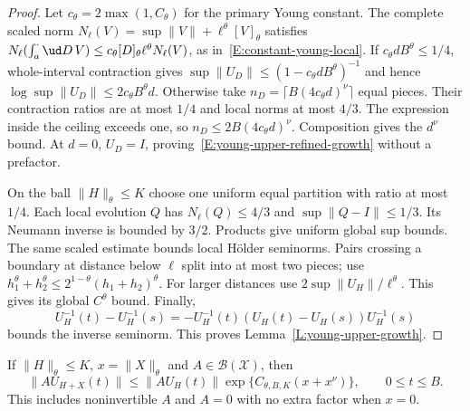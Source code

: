 \begin{proof}
  Let $c_\theta=2\max(1,C_\theta)$ for the primary Young constant.
  The complete scaled norm
  $N_\ell(V)=\sup\|V\|+\ell^\theta[V]_\theta$ satisfies
  $N_\ell(\int_a^\cdot\ud D\,V)
  \le c_\theta[D]_\theta\ell^\theta N_\ell(V)$,
  as in~\eqref{E:constant-young-local}.
  If $c_\theta dB^\theta\le1/4$, whole-interval contraction gives
  $\sup\|U_D\|\le(1-c_\theta dB^\theta)^{-1}$ and hence
  $\log\sup\|U_D\|\le2c_\theta B^\theta d$.
  Otherwise take $n_D=\lceil B(4c_\theta d)^\nu\rceil$ equal
  pieces. Their contraction ratios are at most $1/4$ and local
  norms at most $4/3$. The expression inside the ceiling exceeds
  one, so $n_D\le2B(4c_\theta d)^\nu$.
  Composition gives the $d^\nu$ bound. At $d=0$, $U_D=I$,
  proving~\eqref{E:young-upper-refined-growth} without a prefactor.

  On the ball $\|H\|_\theta\le K$ choose one uniform equal
  partition with ratio at most $1/4$.
  Each local evolution $Q$ has $N_\ell(Q)\le4/3$ and
  $\sup\|Q-I\|\le1/3$. Its Neumann inverse is bounded by $3/2$.
  Products give uniform global sup bounds.
  The same scaled estimate bounds local H\"older seminorms.
  Pairs crossing a boundary at distance below $\ell$ split into
  at most two pieces; use
  $h_1^\theta+h_2^\theta\le2^{1-\theta}(h_1+h_2)^\theta$.
  For larger distances use $2\sup\|U_H\|/\ell^\theta$.
  This gives its global $C^\theta$ bound. Finally,
  \[
    U_H^{-1}(t)-U_H^{-1}(s)
    =-U_H^{-1}(t)(U_H(t)-U_H(s))U_H^{-1}(s)
  \]
  bounds the inverse seminorm.
  This proves Lemma~\ref{L:young-upper-growth}.
\end{proof}

\begin{proposition}
  \label{P:young-upper-multiplicative}
  If $\|H\|_\theta\le K$, $x=\|X\|_\theta$ and
  $A\in\mathcal B(\mathcal X)$, then
  \begin{equation}\label{E:young-upper-multiplicative}
    \|AU_{H+X}(t)\|
    \le\|AU_H(t)\|\exp\{C_{\theta,B,K}(x+x^\nu)\},
    \qquad 0\le t\le B.
  \end{equation}
  This includes noninvertible $A$ and $A=0$ with no extra factor
  when $x=0$.
\end{proposition}

